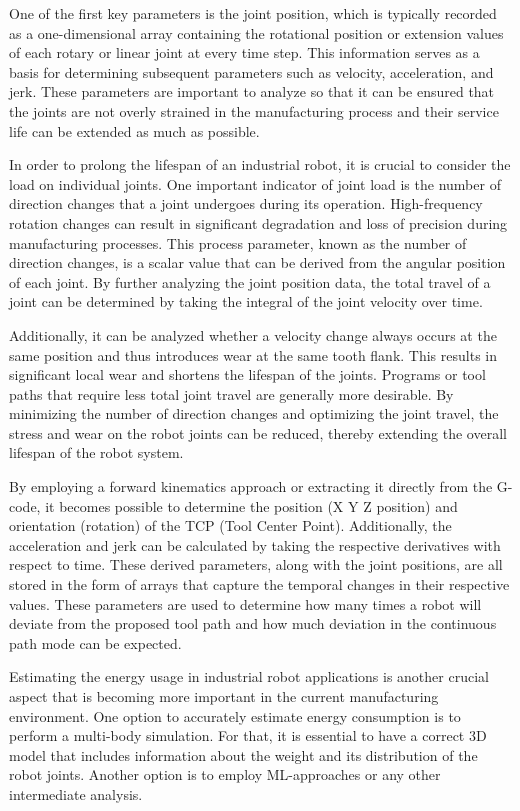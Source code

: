 One of the first key parameters is the joint position, which is typically recorded as a one-dimensional array containing the rotational position or extension values of each rotary or linear joint at every time step. This information serves as a basis for determining subsequent parameters such as velocity, acceleration, and jerk. These parameters are important to analyze so that it can be ensured that the joints are not overly strained in the manufacturing process and their service life can be extended as much as possible.
 
In order to prolong the lifespan of an industrial robot, it is crucial to consider the load on individual joints. One important indicator of joint load is the number of direction changes that a joint undergoes during its operation. High-frequency rotation changes can result in significant degradation and loss of precision during manufacturing processes.
This process parameter, known as the number of direction changes, is a scalar value that can be derived from the angular position of each joint. By further analyzing the joint position data, the total travel of a joint can be determined by taking the integral of the joint velocity over time.

Additionally, it can be analyzed whether a velocity change always occurs at the same position and thus introduces wear at the same tooth flank. This results in significant local wear and shortens the lifespan of the joints. 
\newpage
Programs or tool paths that require less total joint travel are generally more desirable. By minimizing the number of direction changes and optimizing the joint travel, the stress and wear on the robot joints can be reduced, thereby extending the overall lifespan of the robot system.

By employing a forward kinematics approach or extracting it directly from the G-code, it becomes possible to determine the position (X Y Z position) and orientation (rotation) of the TCP (Tool Center Point). Additionally, the acceleration and jerk can be calculated by taking the respective derivatives with respect to time. These derived parameters, along with the joint positions, are all stored in the form of arrays that capture the temporal changes in their respective values. These parameters are used to determine how many times a robot will deviate from the proposed tool path and how much deviation in the continuous path mode can be expected.



Estimating the energy usage in industrial robot applications is another crucial aspect that is becoming more important in the current manufacturing environment. One option to accurately estimate energy consumption is to perform a multi-body simulation. For that, it is essential to have a correct 3D model that includes information about the weight and its distribution of the robot joints. Another option is to employ ML-approaches or any other intermediate analysis.

